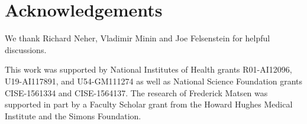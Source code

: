 \documentclass{article}
\newcommand{\beginsupplement}{%
        \setcounter{table}{0}
        \renewcommand{\thetable}{S\arabic{table}}%
        \setcounter{figure}{0}
        \renewcommand{\thefigure}{S\arabic{figure}}%
     }
\begin{document}
\section*{Acknowledgements}
We thank Richard Neher, Vladimir Minin and Joe Felsenstein for helpful discussions.

This work was supported by National Institutes of Health grants R01-AI12096, U19-AI117891, and U54-GM111274 as well as National Science Foundation grants CISE-1561334 and CISE-1564137.
The research of Frederick Matsen was supported in part by a Faculty Scholar grant from the Howard Hughes Medical Institute and the Simons Foundation.




\newpage
\beginsupplement


\end{document}
